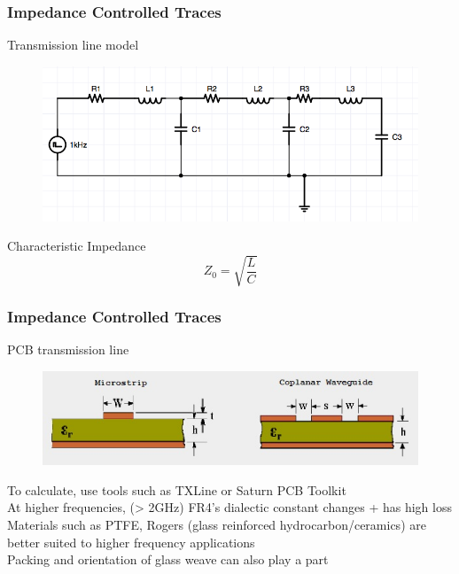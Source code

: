 \documentclass[t]{beamer}
\begin{document}
\begin{frame}
\frametitle{Impedance Controlled Traces}
Transmission line model\\
\begin{figure}
	\includegraphics[width=0.7\linewidth]{transmissionLine.png}
\end{figure}
Characteristic Impedance
$$ Z_0 = \sqrt{\frac{L}{C}} $$
\end{frame}
\begin{frame}
\frametitle{Impedance Controlled Traces}
PCB transmission line\\
\begin{figure}
	\includegraphics[width=0.8\linewidth]{microstrip.jpg}
\end{figure}
To calculate, use tools such as TXLine or Saturn PCB Toolkit\\
\vspace{2mm}
At higher frequencies, (> 2GHz) FR4's dialectic constant changes + has high loss\\
Materials such as PTFE, Rogers (glass reinforced hydrocarbon/ceramics) are better suited to higher frequency applications \\
Packing and orientation of glass weave can also play a part 
\end{frame}
\end{document}

